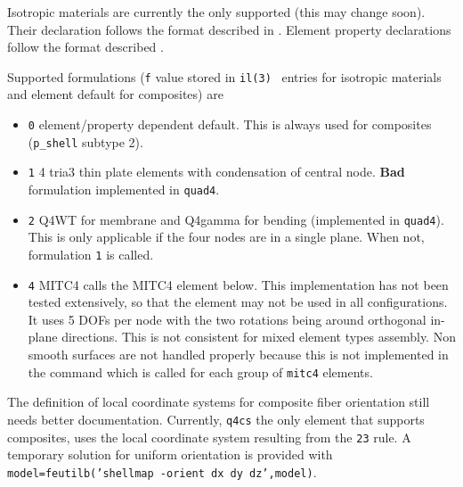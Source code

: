 Isotropic materials are currently the only supported (this may change soon). Their declaration follows the format described in \melastic.
Element property declarations follow the format described \pshell.


Supported formulations ({\tt f} value stored in {\tt il(3)} \pshell\ entries for isotropic materials and element default for composites) are 

\begin{itemize}
 \item {\tt 0} element/property dependent default. This is always used for composites ({\tt p\_shell} subtype 2). 
 \item {\tt 1} 4 tria3 thin plate elements with condensation of central node. {\bf Bad} formulation implemented in {\tt quad4}. 
 \item {\tt 2} Q4WT for membrane and Q4gamma for bending (implemented in {\tt quad4}). This is only applicable if the four nodes are in a single plane. When not, formulation {\tt 1} is called.
 \item {\tt 4} MITC4 calls the MITC4 element below. This implementation has not been tested extensively, so that the element may not be used in all configurations.  It uses 5 DOFs per node with the two rotations being around orthogonal in-plane directions. This is not consistent for mixed element types assembly. Non smooth surfaces are not handled properly because this is not implemented in the  command which is called for each group of {\tt mitc4} elements. 
\end{itemize}

\begin{SDT}
The definition of local coordinate systems for composite fiber orientation still needs better documentation. Currently, {\tt q4cs} the only element that supports composites, uses the local coordinate system resulting from the  {\tt 23} rule. A temporary solution for uniform orientation is provided with {\tt model=feutilb('shellmap -orient dx dy dz',model)}. 
\end{SDT}


